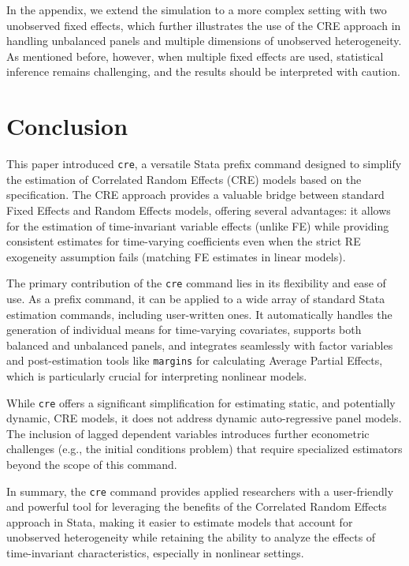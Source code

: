 \documentclass[bib]{statapress}
\begin{document}
In the appendix, we extend the simulation to a more complex setting with
two unobserved fixed effects, which further illustrates the use of the
CRE approach in handling unbalanced panels and multiple dimensions of
unobserved heterogeneity. As mentioned before, however, when multiple
fixed effects are used, statistical inference remains challenging, and
the results should be interpreted with caution.

\section{Conclusion}\label{sec-6}

This paper introduced \texttt{cre}, a versatile Stata prefix command
designed to simplify the estimation of Correlated Random Effects (CRE)
models based on the \citet{mundlak1978pooling} specification. The CRE
approach provides a valuable bridge between standard Fixed Effects and
Random Effects models, offering several advantages: it allows for the
estimation of time-invariant variable effects (unlike FE) while
providing consistent estimates for time-varying coefficients even when
the strict RE exogeneity assumption fails (matching FE estimates in
linear models).

The primary contribution of the \texttt{cre} command lies in its
flexibility and ease of use. As a prefix command, it can be applied to a
wide array of standard Stata estimation commands, including user-written
ones. It automatically handles the generation of individual means for
time-varying covariates, supports both balanced and unbalanced panels,
and integrates seamlessly with factor variables and post-estimation
tools like \texttt{margins} for calculating Average Partial Effects,
which is particularly crucial for interpreting nonlinear models.

While \texttt{cre} offers a significant simplification for estimating
static, and potentially dynamic, CRE models, it does not address dynamic
auto-regressive panel models. The inclusion of lagged dependent
variables introduces further econometric challenges (e.g., the initial
conditions problem) that require specialized estimators beyond the scope
of this command.

In summary, the \texttt{cre} command provides applied researchers with a
user-friendly and powerful tool for leveraging the benefits of the
Correlated Random Effects approach in Stata, making it easier to
estimate models that account for unobserved heterogeneity while
retaining the ability to analyze the effects of time-invariant
characteristics, especially in nonlinear settings.
\end{document}
